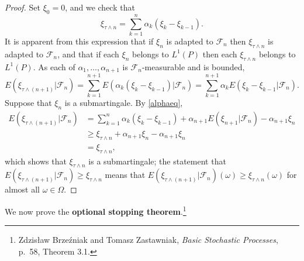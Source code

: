 \documentclass{article}
\theoremstyle{definition}
\begin{document}
\begin{proof}
Set $\xi_0=0$, and we check that
\[
\xi_{\tau \wedge n} = \sum_{k=1}^n \alpha_k (\xi_k - \xi_{k-1}).
\]
It is apparent from this expression that if $\xi_n$ is adapted to $\mathscr{F}_n$ then $\xi_{\tau \wedge n}$ is adapted to $\mathscr{F}_n$, and that
if each $\xi_n$ belongs to $L^1(P)$ then each $\xi_{\tau \wedge n}$ belongs to $L^1(P)$. 
As each of $\alpha_1,\ldots,\alpha_{n+1}$ is $\mathscr{F}_n$-measurable and is bounded,
\begin{equation}
E(\xi_{\tau \wedge (n+1)}|\mathscr{F}_{n}) = \sum_{k=1}^{n+1} E(\alpha_k(\xi_k-\xi_{k-1})|\mathscr{F}_n)
=\sum_{k=1}^{n+1} \alpha_k E(\xi_k-\xi_{k-1}|\mathscr{F}_n).
\label{alphaeq}
\end{equation}
Suppose that $\xi_n$ is a submartingale. By \eqref{alphaeq},
\begin{align*}
E(\xi_{\tau \wedge (n+1)}|\mathscr{F}_{n})  &= \sum_{k=1}^{n} \alpha_k (\xi_k-\xi_{k-1}) + \alpha_{n+1}E(\xi_{n+1}|\mathscr{F}_n)
-\alpha_{n+1} \xi_n\\
&\geq \xi_{\tau \wedge n} + \alpha_{n+1} \xi_n -\alpha_{n+1} \xi_n\\
&=\xi_{\tau \wedge n},
\end{align*}
which shows that $\xi_{\tau \wedge n}$ is a submartingale; the statement that
$E(\xi_{\tau \wedge (n+1)}|\mathscr{F}_{n})  \geq \xi_{\tau \wedge n}$ means that
$E(\xi_{\tau \wedge (n+1)}|\mathscr{F}_n)(\omega) \geq \xi_{\tau \wedge n}(\omega)$ for almost all
$\omega \in \Omega$.
\end{proof}


We now prove the \textbf{optional stopping theorem}.\footnote{Zdzis\l{}aw Brze\'zniak and Tomasz Zastawniak, {\em Basic Stochastic Processes},
p.~58, Theorem 3.1.}
\end{document}
